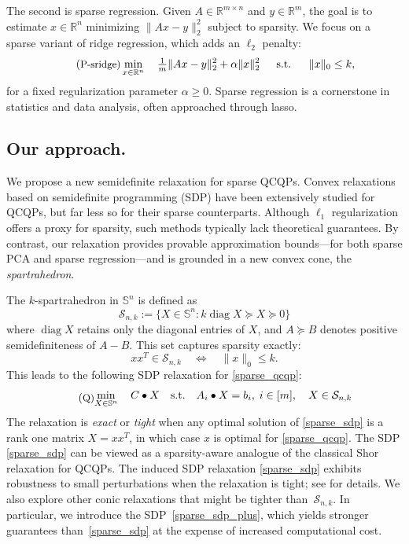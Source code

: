 \documentclass[11pt]{amsart}
\newcommand{\ourset}{spartrahedron\xspace}
\newcommand{\Szero}[2]{\ensuremath{\mathcal{S}_{#1,#2}}}
\theoremstyle{plain}
\theoremstyle{definition}
\theoremstyle{remark}
\newcommand{\RR}{\mathbb{R}}
\renewcommand{\SS}{{\mathbb{S}}}
\newcommand{\st}{\text{\, s.t.\, }}
\DeclareMathOperator{\diag}{diag}
\begin{document}
	The second is {sparse regression}.
	Given $A \in \RR^{m\times n}$ and $y \in \RR^m$, the goal is to estimate $x \in \RR^n$ minimizing $\|Ax-y\|_2^2$ subject to sparsity.
	We focus on a sparse variant of ridge regression, which adds an $\ell_2$ penalty:
	\begin{equation}\label{sparse_lr}\tag{\small{P-sridge}}
		\min_{x\in \RR^n} \quad \tfrac 1 m \|A x - y\|^2_2 + \alpha \|x\|^2_2
		\quad\st\quad \|x\|_0 \leq k,
	\end{equation}
	for a fixed regularization parameter $\alpha \geq 0$.
	Sparse regression is a cornerstone in statistics and data analysis,
	often approached through lasso.
	
	\subsection*{Our approach.}
	We propose a new semidefinite relaxation for sparse QCQPs.
	Convex relaxations based on semidefinite programming (SDP) have been extensively studied for QCQPs, but far less so for their sparse counterparts.
	Although $\ell_1$ regularization offers a proxy for sparsity, such methods typically lack theoretical guarantees.
	By contrast, our relaxation provides provable approximation bounds---for both sparse PCA and sparse regression---and is grounded in a new convex cone, the \emph{\ourset}.
	
	The $k$-\ourset in $\SS^n$ is defined as
	\begin{equation}
		\label{eq:ourset}
		\Szero{n}{k} := \{X \in \mathbb{S}^n:
		k\diag X \succeq X \succeq 0\}
	\end{equation}
	where $\diag X$ retains only the diagonal entries of $X$, and $A \succeq B$ denotes positive semidefiniteness of $A-B$.
	This set captures sparsity exactly:
	\begin{equation}\label{eq:property}
		x x^T \in \Szero{n}{k} \quad \iff \quad \|x\|_0 \leq k.
	\end{equation}
	This leads to the following SDP relaxation for \eqref{sparse_qcqp}:
	\begin{equation}\label{sparse_sdp}\tag{\small{Q}}
		\begin{aligned}
			\min_{X \in \mathbb{S}^n}\quad C \bullet X
			\quad\text{s.t.}\quad A_i \bullet X = b_i,\;  i \in [m],\quad
			X\in \Szero{n}{k}
		\end{aligned}
	\end{equation}
	The relaxation is \emph{exact} or \emph{tight} when any optimal solution of \eqref{sparse_sdp} is a rank one matrix $X = x x^T$, in which case $x$ is optimal for \eqref{sparse_qcqp}. 
	The SDP \eqref{sparse_sdp} can be viewed as a sparsity-aware analogue of the classical Shor relaxation for QCQPs.
    The induced SDP relaxation \eqref{sparse_sdp} exhibits robustness to small perturbations when the relaxation is tight; see  for details.
	We also explore other conic relaxations that might be tighter than~\Szero{n}{k}. In particular, we introduce the SDP~\eqref{sparse_sdp_plus}, which yields stronger guarantees than~\eqref{sparse_sdp} at the expense of increased computational cost.
	
\end{document}
